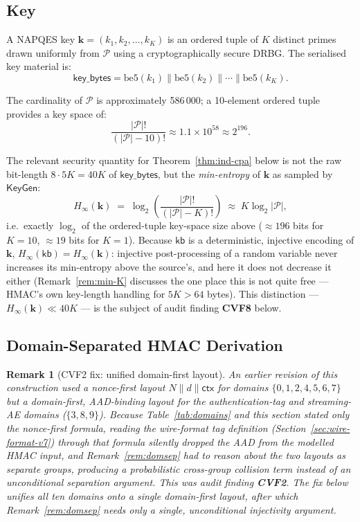 \documentclass[11pt,a4paper]{article}
\newtheorem{remark}[theorem]{Remark}
\begin{document}
\subsection{Key}

A NAPQES key $\mathbf{k} = (k_1, k_2, \ldots, k_K)$ is an ordered tuple
of $K$ distinct primes drawn uniformly from $\mathcal{P}$ using a
cryptographically secure DRBG.  The serialised key material is:
\[
  \mathsf{key\_bytes} = \mathrm{be5}(k_1) \| \mathrm{be5}(k_2) \| \cdots \| \mathrm{be5}(k_K).
\]

The cardinality of $\mathcal{P}$ is approximately 586\,000; a 10-element
ordered tuple provides a key space of:
\[
  \frac{|\mathcal{P}|!}{(|\mathcal{P}|-10)!} \approx 1.1 \times 10^{58} \approx 2^{196}.
\]

The relevant security quantity for Theorem~\ref{thm:ind-cpa} below is not
the raw bit-length $8\cdot 5K = 40K$ of $\mathsf{key\_bytes}$, but the
\emph{min-entropy} of $\mathbf{k}$ as sampled by $\mathsf{KeyGen}$:
\[
  H_\infty(\mathbf{k}) \;=\; \log_2\!\left(\frac{|\mathcal{P}|!}{(|\mathcal{P}|-K)!}\right)
  \;\approx\; K\log_2|\mathcal{P}|,
\]
i.e.\ exactly $\log_2$ of the ordered-tuple key-space size above
($\approx 196$ bits for $K=10$, $\approx 19$ bits for $K=1$). Because
$\mathsf{kb}$ is a deterministic, injective encoding of $\mathbf{k}$,
$H_\infty(\mathsf{kb}) = H_\infty(\mathbf{k})$: injective post-processing
of a random variable never increases its min-entropy above the source's,
and here it does not decrease it either (Remark~\ref{rem:min-K} discusses
the one place this is not quite free --- HMAC's own key-length handling
for $5K>64$ bytes). This distinction --- $H_\infty(\mathbf{k}) \ll 40K$ ---
is the subject of audit finding \textbf{CVF8} below.

\subsection{Domain-Separated HMAC Derivation}

\begin{remark}[CVF2 fix: unified domain-first layout]
An earlier revision of this construction used a \emph{nonce-first} layout
$N \| d \| \mathsf{ctx}$ for domains $\{0,1,2,4,5,6,7\}$ but a
\emph{domain-first}, AAD-binding layout for the authentication-tag and
streaming-AE domains ($\{3,8,9\}$). Because Table~\ref{tab:domains} and this
section stated only the nonce-first formula, reading the wire-format tag
definition (Section~\ref{sec:wire-format-v7}) through that formula silently
dropped the AAD from the modelled HMAC input, and Remark~\ref{rem:domsep}
had to reason about the two layouts as separate groups, producing a
probabilistic cross-group collision term instead of an unconditional
separation argument. This was audit finding \textbf{CVF2}. The fix below
unifies all ten domains onto a single domain-first layout, after which
Remark~\ref{rem:domsep} needs only a single, unconditional injectivity
argument.
\end{remark}
\end{document}
